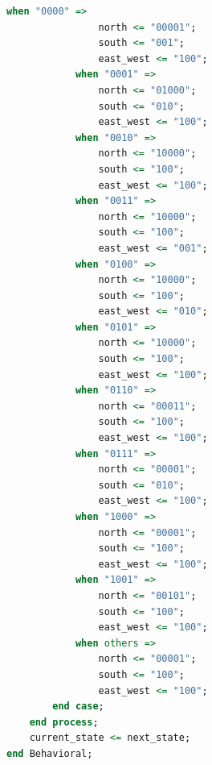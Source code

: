 \documentclass[11pt]{article}
\begin{document}
\begin{appendices}
\begin{lstlisting}[language=VHDL]
            when "0000" =>
                north <= "00001";
                south <= "001";
                east_west <= "100";
            when "0001" =>
                north <= "01000";
                south <= "010";
                east_west <= "100";
            when "0010" =>
                north <= "10000";
                south <= "100";
                east_west <= "100";
            when "0011" =>
                north <= "10000";
                south <= "100";
                east_west <= "001";
            when "0100" =>
                north <= "10000";
                south <= "100";
                east_west <= "010";
            when "0101" =>
                north <= "10000";
                south <= "100";
                east_west <= "100";
            when "0110" =>
                north <= "00011";
                south <= "100";
                east_west <= "100";
            when "0111" =>
                north <= "00001";
                south <= "010";
                east_west <= "100";
            when "1000" =>
                north <= "00001";
                south <= "100";
                east_west <= "100";
            when "1001" =>
                north <= "00101";
                south <= "100";
                east_west <= "100";
            when others =>
                north <= "00001";
                south <= "100";
                east_west <= "100";
        end case;
    end process;
    current_state <= next_state;
end Behavioral;
\end{lstlisting}


\end{appendices}
\end{document}
